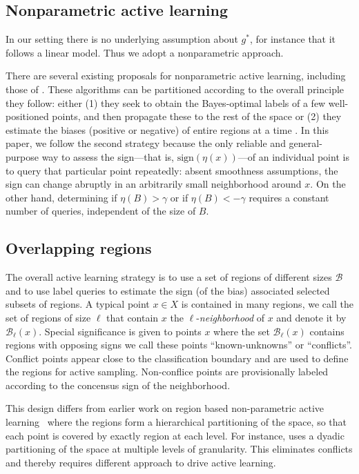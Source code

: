 \documentclass{article}
\def\B{{\mathcal B}}
\begin{document}
\subsection{Nonparametric active learning}

In our setting there is no underlying assumption about $g^*$, for
instance that it follows a linear model. Thus we adopt a nonparametric
approach.

There are several existing proposals for nonparametric active
learning, including those of
\citep{CN08,DH08,M12,DNZ15,H17,ASU18}. These algorithms can be
partitioned according to the overall principle they follow: either (1)
they seek to obtain the Bayes-optimal labels of a few well-positioned
points, and then propagate these to the rest of the space
\cite{DNZ15,H17,ASU18} or (2) they estimate the biases (positive or
negative) of entire regions at a time \cite{DH08,M12}. In this paper,
we follow the second strategy because the only reliable and
general-purpose way to assess the sign---that is,
$\mbox{sign}(\eta(x))$---of an individual point is to query that
particular point repeatedly: absent smoothness assumptions, the sign
can change abruptly in an arbitrarily small neighborhood around
$x$. On the other hand, determining if $\eta(B)>\gamma$ or if $\eta(B)<-\gamma$
requires a constant number of queries, independent of the size of $B$.

\subsection{Overlapping regions}

The overall active learning strategy is to use a set of regions of
different sizes $\B$ and to use label queries to estimate the sign (of
the bias) associated selected subsets of regions. A typical point
$x \in X$ is contained in many regions, we call the set of regions of
size $\ell$ that contain $x$ the $\ell$-{\em neighborhood} of $x$ and
denote it by $\B_\ell(x)$. Special significance is given to points $x$
where the set $\B_\ell(x)$ contains regions with opposing signs we
call these points ``known-unknowns'' or ``conflicts''. Conflict points
appear close to the classification boundary and are used to define the
regions for active sampling. Non-conflice points are provisionally
labeled according to the concensus sign of the neighborhood.

This design differs from earlier work on region based
non-parametric active learning~\cite{DH08,M12} where the regions form
a hierarchical partitioning of the space, so that each point is
covered by exactly region at each level.  For instance, \cite{M12}
uses a dyadic partitioning of the space at multiple levels of
granularity. This eliminates conflicts and thereby
requires different approach to drive active learning.
\end{document}

